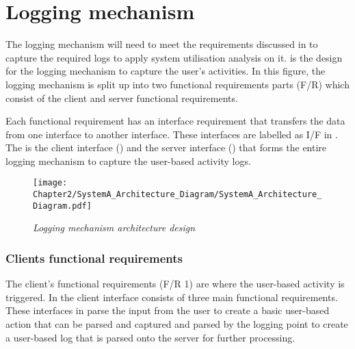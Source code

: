 \section{Logging mechanism}\label{Ch2:LoggingMechanism} The logging mechanism will need to meet the requirements discussed in  to capture the required logs to apply system utilisation analysis on it.  is the design for the logging mechanism to capture the user's activities. In this figure, the logging mechanism is split up into two functional requirements parts (F/R) which consist of the client and server functional requirements.\par Each functional requirement has an interface requirement that transfers the data from one interface to another interface. These interfaces are labelled as I/F in . The  is the client interface () and the server interface () that forms the entire logging mechanism to capture the user-based activity logs.

\begin{figure}[!htb] %
	\centering %
	\texttt{[image: Chapter2/SystemA\_Architecture\_Diagram/SystemA\_Architecture\_Diagram.pdf]}
	\caption[Logging mechanism architecture design]
	{\textit{Logging mechanism architecture design}}\label{fig:ch2_systemDesign}
\end{figure}

\subsubsection{Clients functional requirements}
The client's functional requirements (F/R 1) are where the user-based activity is triggered. In  the client interface consists of three main functional requirements. These interfaces in  parse the input from the user to create a basic user-based action that can be parsed and captured and parsed by the logging point to create a user-based log that is parsed onto the server for further processing.

